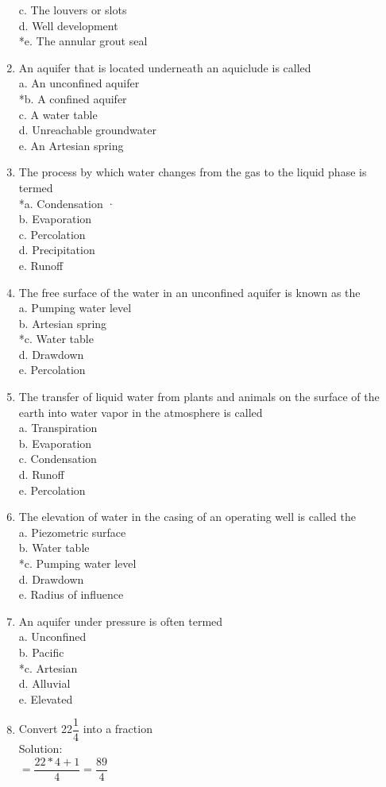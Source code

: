 \begin{enumerate}[1.]
 c. The louvers or slots\\
 d. Well development\\
 *e. The annular grout seal\\
 \item An aquifer that is located underneath an aquiclude is called\\
 a. An unconfined aquifer\\
 *b. A confined aquifer\\
 c. A water table\\
 d. Unreachable groundwater\\
 e. An Artesian spring\\
 \item The process by which water changes from the gas to the liquid phase is termed\\
 *a. Condensation ·\\
 b. Evaporation\\
 c. Percolation\\
 d. Precipitation\\
 e. Runoff\\
 \item The free surface of the water in an unconfined aquifer is known as the\\
 a. Pumping water level\\
 b. Artesian spring\\
 *c. Water table\\
 d. Drawdown\\
 e. Percolation\\
 \item The transfer of liquid water from plants and animals on the surface of the earth into water vapor in the atmosphere is called\\
 a. Transpiration\\
 b. Evaporation\\
 c. Condensation\\
 d. Runoff\\
 e. Percolation\\
 \item The elevation of water in the casing of an operating well is called the\\
 a. Piezometric surface\\
 b. Water table\\
 *c. Pumping water level\\
 d. Drawdown\\
 e. Radius of influence\\
 \item An aquifer under pressure is often termed\\
 a. Unconfined\\
 b. Pacific\\
 *c. Artesian\\
 d. Alluvial\\
 e. Elevated\\
\item Convert 22$\dfrac{1}{4}$ into a fraction\\
Solution:\\
$=\dfrac{22*4 + 1}{4}=\boxed{\dfrac{89}{4}}$


\end{enumerate}
